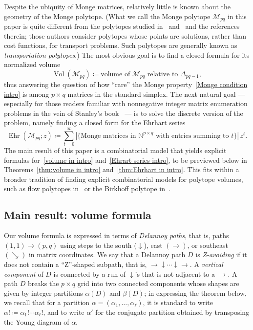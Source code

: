 \documentclass[noamsfonts,10pt]{amsart}
\newcommand{\N}{\mathbb{N}}
\newcommand{\M}{\mathcal{M}}
\newcommand{\al}{\alpha}
\newcommand{\be}{\beta}
\DeclareMathOperator{\Vol}{Vol}
\DeclareMathOperator{\Ehr}{Ehr}
\newcommand{\1}{\mathbf{1}}
\theoremstyle{plain}
\theoremstyle{definition}
\numberwithin{equation}{section}
\begin{document}
Despite the ubiquity of Monge matrices, relatively little is known about the geometry of the Monge polytope.
(What we call the Monge polytope $\M_{pq}$ in this paper is quite different from the polytopes studied in~\cite{Friesecke} and~\cite{Vogler} and the references therein;
those authors consider polytopes whose points are solutions, rather than cost functions, for transport problems.
Such polytopes are generally known as \emph{transportation polytopes}.)
The most obvious goal is to find a closed formula for its normalized volume
\begin{equation}
    \label{volume in intro}
    \Vol(\M_{pq})
 \coloneqq \text{volume of $\M_{pq}$ relative to $\Delta_{pq-1}$},
 \end{equation}
 thus answering the question of how ``rare'' the Monge property~\eqref{Monge condition intro} is among $p \times q$ matrices in the standard simplex.
 The next natural goal --- especially for those readers familiar with nonnegative integer matrix enumeration problems in the vein of Stanley's book~\cite{StanleyCCA} --- is to solve the discrete version of the problem, namely finding a closed form for the Ehrhart series
\begin{equation}
    \label{Ehrart series intro}
    \Ehr(\M_{pq}; z) \coloneqq \sum_{t=0}^\infty \left| \Big\{ \text{Monge matrices in $\N^{p \times q}$ with entries summing to $t$} \Big\} \right| \, z^t.
\end{equation}
The main result of this paper is a combinatorial model that yields explicit formulas for~\eqref{volume in intro} and~\eqref{Ehrart series intro}, to be previewed below in Theorems~\ref{thm:volume in intro} and~\ref{thm:Ehrhart in intro}.
This fits within a broader tradition of finding explicit combinatorial models for polytope volumes, such as flow polytopes in~\cite{Benedetti19} or the Birkhoff polytope in~\cite{DLY09}.

\subsection*{Main result: volume formula}

Our volume formula is expressed in terms of \emph{Delannoy paths}, that is, paths $(1,1) \rightarrow (p,q)$ using steps to the south ($\downarrow$), east $(\rightarrow)$, or southeast $(\searrow)$ in matrix coordinates.
We say that a Delannoy path $D$ is \emph{Z-avoiding} if it does not contain a ``Z''-shaped subpath, that is, $\rightarrow \downarrow \cdots \downarrow\rightarrow$.
A \emph{vertical component} of $D$ is connected by a run of $\downarrow$'s that is not adjacent to a $\rightarrow$.
A path $D$ breaks the $p \times q$ grid into two connected components whose shapes are given by integer partitions $\al(D)$ and $\be(D)$;
in expressing the theorem below, we recall that for a partition $\al = (\al_1, \ldots, \al_\ell)$, it is standard to write $\al! \coloneqq \al_1! \cdots \al_\ell!$, and to write $\al'$ for the conjugate partition obtained by transposing the Young diagram of $\al$.
\end{document}
